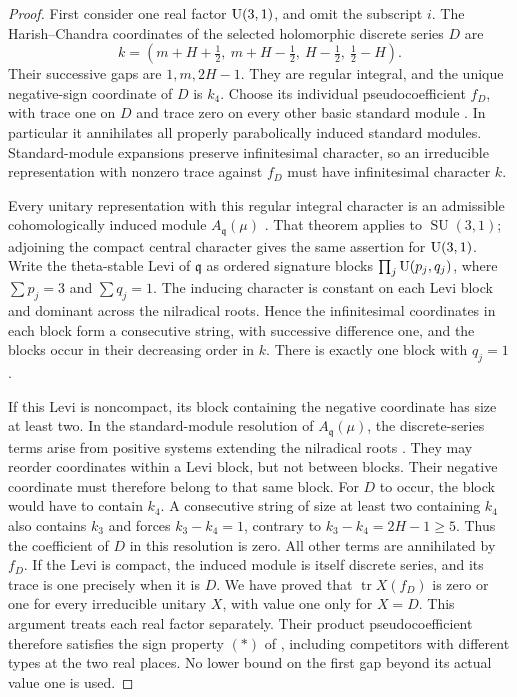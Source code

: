\begin{proof}
First consider one real factor $\operatorname{U}(3,1)$, and omit the subscript $i$.
The Harish--Chandra coordinates of the selected holomorphic discrete
series $D$ are
\[
 k=(m+H+\tfrac12,\ m+H-\tfrac12,\ H-\tfrac12,\ \tfrac12-H).
\]
Their successive gaps are $1,m,2H-1$.  They are regular integral,
and the unique negative-sign coordinate of $D$ is $k_4$.
Choose its individual pseudocoefficient $f_D$, with trace one on $D$
and trace zero on every other basic standard module
\citep[Proposition~4 and its corollary, pp.~212--213]{ClozelDelorme1990}.
In particular it annihilates all properly parabolically induced
standard modules.  Standard-module expansions preserve infinitesimal
character, so an irreducible representation with nonzero trace against
$f_D$ must have infinitesimal character $k$.

Every unitary representation with this regular integral character is
an admissible cohomologically induced module $A_{\mathfrak q}(\mu)$
\citep[Theorem~1.2]{SalamancaRiba1988}.  That theorem applies to
$\operatorname{SU}(3,1)$; adjoining the compact central character gives the same
assertion for $\operatorname{U}(3,1)$.  Write the theta-stable Levi of
$\mathfrak q$ as ordered signature blocks
$\prod_j\operatorname{U}(p_j,q_j)$, where $\sum p_j=3$ and $\sum q_j=1$.
The inducing character is constant on each Levi block and dominant
across the nilradical roots.  Hence the infinitesimal coordinates
in each block form a consecutive string, with successive difference
one, and the blocks occur in their decreasing order in $k$.
There is exactly one block with $q_j=1$.

If this Levi is noncompact, its block containing the negative
coordinate has size at least two.  In the standard-module resolution
of $A_{\mathfrak q}(\mu)$, the discrete-series terms arise from
positive systems extending the nilradical roots
\citep[Theorem~8.2 and Lemma~8.8]{AdamsJohnson1987}.
They may reorder coordinates within a Levi block, but not between
blocks.  Their negative coordinate must therefore belong to that
same block.  For $D$ to occur, the block would have to contain $k_4$.
A consecutive string of size at least two containing $k_4$ also
contains $k_3$ and forces $k_3-k_4=1$, contrary to
$k_3-k_4=2H-1\geq5$.  Thus the coefficient of $D$ in this resolution
is zero.  All other terms are annihilated by $f_D$.
If the Levi is compact, the induced module is itself discrete
series, and its trace is one precisely when it is $D$.
We have proved that $\operatorname{tr}X(f_D)$ is zero or one for
every irreducible unitary $X$, with value one only for $X=D$.
This argument treats each real factor separately.  Their product
pseudocoefficient therefore satisfies the sign property $(*)$ of
\citet[Section~5.1]{Labesse2011CM}, including competitors with
different types at the two real places.  No lower bound on the
first gap beyond its actual value one is used.


\end{proof}
